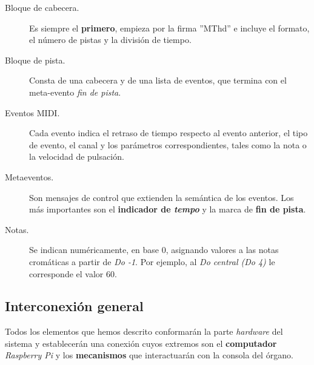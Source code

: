 \documentclass[10pt,a4paper]{article}
\begin{document}
	\begin{description}
		\item[Bloque de cabecera.] Es siempre el \textbf{primero}, empieza por la firma ''MThd'' e incluye el formato, el número de pistas y la división de tiempo.
		
		\item[Bloque de pista.] Consta de una cabecera y de una lista de eventos, que termina con el meta-evento \textit{fin de pista}.
		
		\item[Eventos MIDI.] Cada evento indica el retraso de tiempo respecto al evento anterior, el tipo de evento, el canal y los parámetros correspondientes, tales como la nota o la velocidad de pulsación.
		
		\item[Metaeventos.] Son mensajes de control que extienden la semántica de los eventos. Los más importantes son el \textbf{indicador de \textit{tempo}} y la marca de \textbf{fin de pista}.
		
		\item[Notas.] Se indican numéricamente, en base 0, asignando valores a las notas cromáticas a partir de \textit{Do -1}. Por ejemplo, al \textit{Do central (Do 4)} le corresponde el valor 60.
	\end{description}
	
	\subsection{Interconexión general}
	
	Todos los elementos que hemos descrito conformarán la parte \textit{hardware} del sistema y establecerán una conexión cuyos extremos son el \textbf{computador} \textit{Raspberry Pi} y los \textbf{mecanismos} que interactuarán con la consola del órgano.
	
\end{document}
